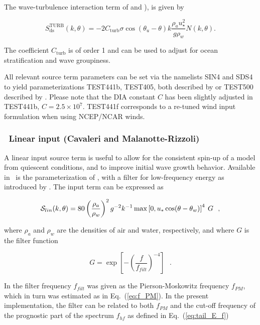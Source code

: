 The wave-turbulence interaction term of \cite{art:TB02} and \cite{art:AJ06}),
is given by

\begin{equation}
S_{\mathrm{ds}}^{\mathrm{TURB}}\left(k,\theta\right) = - 2
C_{\mathrm{turb}} \sigma \cos(\theta_u - \theta) k \frac{\rho_a
u_\star^2}{g \rho_w}  N\left(k,\theta\right) .
\end{equation}

\noindent
The coefficient $C_{\mathrm{turb}}$ is of order 1 and can be used to adjust for
ocean stratification and wave groupiness.

\noindent
All relevant source term parameters can be set via the namelists SIN4 and SDS4
to yield parameterizations TEST441b, TEST405, 
both described by \cite{art:Aea10}  or TEST500 described by \cite{art:FA11}. Please note that 
the DIA constant $C$ has been slightly adjusted in TEST441b, $C=2.5\times 10^7$. TEST441f corresponds 
to a re-tuned wind input formulation when using NCEP/NCAR winds. 

\vsssub
\subsubsection{~Linear input (Cavaleri and Malanotte-Rizzoli)} \label{sec:c&mr}
\vsssub

A linear input source term is useful to allow for the consistent spin-up of a
model from quiescent conditions, and to improve initial wave growth
behavior. Available in \ws\ is the parameterization of \cite{art:CMR81}, with
a filter for low-frequency energy as introduced by \cite{tol:JPO92}. The input
term can be expressed as

\begin{equation}
{\cal S}_{lin}(k,\theta) = 80 \left( \frac{\rho_a}{\rho_w} \right ) ^2
  g^{-2}  k^{-1} \max \left [ 0 , u_* \cos (\theta - \theta_w) \right ]^4 \: G
   \:\:\: , \label{eq:CMR81}
\end{equation}

\noindent
where $\rho_a$ and $\rho_w$ are the densities of air and water, respectively,
and where $G$ is the filter function

\begin{equation}
G = \exp \left [ - \left ( \frac{f}{f_{filt}} \right ) ^{-4} \right ]
\:\:\: . \label{eq:GSln}
\end{equation}

\noindent
In \cite {tol:JPO92} the filter frequency $f_{filt}$ was given as the
Pierson-Moskowitz frequency $f_{PM}$, which in turn was estimated as in
Eq.~(\ref{eq:f_PM}).  In the present implementation, the filter can be related
to both $f_{PM}$ and the cut-off frequency of the prognostic part of the
spectrum $f_{hf}$ as defined in Eq.~(\ref{eq:tail_E_f})

